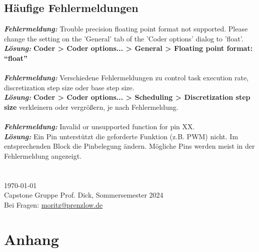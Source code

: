 \documentclass[a4paper,11pt,oneside]{article}
\begin{document}
\subsection*{Häufige Fehlermeldungen}
\textit{\textbf{Fehlermeldung:}} Trouble precision floating point format not supported. Please change the setting on the 'General' tab of the 'Coder options' dialog to 'float'.\\
\textit{\textbf{Lösung:}} \textbf{Coder > Coder options... > General > Floating point format: \enquote{float}}
\\\\
\textit{\textbf{Fehlermeldung:}} Verschiedene Fehlermeldungen zu control task execution rate, discretization step size oder base step size. \\
\textit{\textbf{Lösung: }}\textbf{Coder > Coder options... > Scheduling > Discretization step size} verkleinern oder vergrößern, je nach Fehlermeldung.
\\\\
\textit{\textbf{Fehlermeldung:}} Invalid or unsupported function for pin XX. \\
\textit{\textbf{Lösung:}} Ein Pin unterstützt die geforderte Funktion (z.B. PWM) nicht. Im entsprechenden Block die Pinbelegung ändern. Mögliche Pins werden meist in der Fehlermeldung angezeigt.
\\\\\\
\today \\
Capstone Gruppe Prof. Dick, Sommersemester 2024\\
Bei Fragen: \href{mailto:moritz@prenzlow.de}{moritz@prenzlow.de}\\
\newpage
\section*{Anhang}
\newpage

\printbibliography
\end{document}
